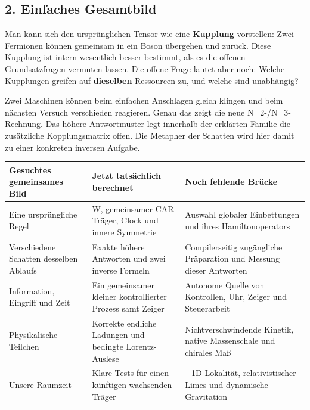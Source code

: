 \subsection{2. Einfaches Gesamtbild}\label{einfaches-gesamtbild}

Man kann sich den ursprünglichen Tensor wie eine \textbf{Kupplung}
vorstellen: Zwei Fermionen können gemeinsam in ein Boson übergehen und
zurück. Diese Kupplung ist intern wesentlich besser bestimmt, als es die
offenen Grundsatzfragen vermuten lassen. Die offene Frage lautet aber
noch: Welche Kupplungen greifen auf \textbf{dieselben} Ressourcen zu,
und welche sind unabhängig?

Zwei Maschinen können beim einfachen Anschlagen gleich klingen und beim
nächsten Versuch verschieden reagieren. Genau das zeigt die neue
N=2-/N=3-Rechnung. Das höhere Antwortmuster legt innerhalb der erklärten
Familie die zusätzliche Kopplungsmatrix offen. Die Metapher der Schatten
wird hier damit zu einer konkreten inversen Aufgabe.

{\def\LTcaptype{none} %
\begin{longtable}[]{@{}
  >{\raggedright\arraybackslash}p{}
  >{\raggedright\arraybackslash}p{}
  >{\raggedright\arraybackslash}p{}@{}}
\toprule\noalign{}
\begin{minipage}[b]{\linewidth}\raggedright
Gesuchtes gemeinsames Bild
\end{minipage} & \begin{minipage}[b]{\linewidth}\raggedright
Jetzt tatsächlich berechnet
\end{minipage} & \begin{minipage}[b]{\linewidth}\raggedright
Noch fehlende Brücke
\end{minipage} \\
\midrule\noalign{}
\endhead
\bottomrule\noalign{}
\endlastfoot
Eine ursprüngliche Regel & W, gemeinsamer CAR-Träger, Clock und innere
Symmetrie & Auswahl globaler Einbettungen und ihres Hamiltonoperators \\
Verschiedene Schatten desselben Ablaufs & Exakte höhere Antworten und
zwei inverse Formeln & Compilerseitig zugängliche Präparation und
Messung dieser Antworten \\
Information, Eingriff und Zeit & Ein gemeinsamer kleiner kontrollierter
Prozess samt Zeiger & Autonome Quelle von Kontrollen, Uhr, Zeiger und
Steuerarbeit \\
Physikalische Teilchen & Korrekte endliche Ladungen und bedingte
Lorentz-Auslese & Nichtverschwindende Kinetik, native Massenschale und
chirales Maß \\
Unsere Raumzeit & Klare Tests für einen künftigen wachsenden Träger &
3+1D-Lokalität, relativistischer Limes und dynamische Gravitation \\
\end{longtable}
}

